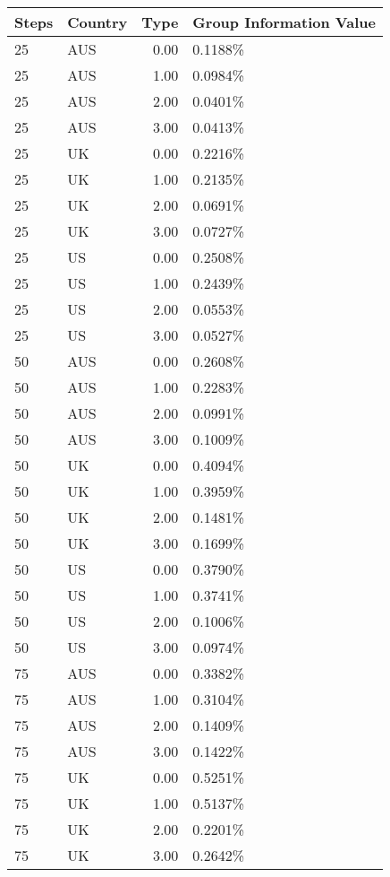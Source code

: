 \begin{table}[ht]
\centering
\begin{tabular}{llrl}
  \hline
Steps & Country & Type & Group Information Value \\ 
  \hline
25 & AUS & 0.00 & 0.1188\% \\ 
  25 & AUS & 1.00 & 0.0984\% \\ 
  25 & AUS & 2.00 & 0.0401\% \\ 
  25 & AUS & 3.00 & 0.0413\% \\ 
  25 & UK & 0.00 & 0.2216\% \\ 
  25 & UK & 1.00 & 0.2135\% \\ 
  25 & UK & 2.00 & 0.0691\% \\ 
  25 & UK & 3.00 & 0.0727\% \\ 
  25 & US & 0.00 & 0.2508\% \\ 
  25 & US & 1.00 & 0.2439\% \\ 
  25 & US & 2.00 & 0.0553\% \\ 
  25 & US & 3.00 & 0.0527\% \\ 
  50 & AUS & 0.00 & 0.2608\% \\ 
  50 & AUS & 1.00 & 0.2283\% \\ 
  50 & AUS & 2.00 & 0.0991\% \\ 
  50 & AUS & 3.00 & 0.1009\% \\ 
  50 & UK & 0.00 & 0.4094\% \\ 
  50 & UK & 1.00 & 0.3959\% \\ 
  50 & UK & 2.00 & 0.1481\% \\ 
  50 & UK & 3.00 & 0.1699\% \\ 
  50 & US & 0.00 & 0.3790\% \\ 
  50 & US & 1.00 & 0.3741\% \\ 
  50 & US & 2.00 & 0.1006\% \\ 
  50 & US & 3.00 & 0.0974\% \\ 
  75 & AUS & 0.00 & 0.3382\% \\ 
  75 & AUS & 1.00 & 0.3104\% \\ 
  75 & AUS & 2.00 & 0.1409\% \\ 
  75 & AUS & 3.00 & 0.1422\% \\ 
  75 & UK & 0.00 & 0.5251\% \\ 
  75 & UK & 1.00 & 0.5137\% \\ 
  75 & UK & 2.00 & 0.2201\% \\ 
  75 & UK & 3.00 & 0.2642\% \\ 

\end{tabular}
\end{table}
